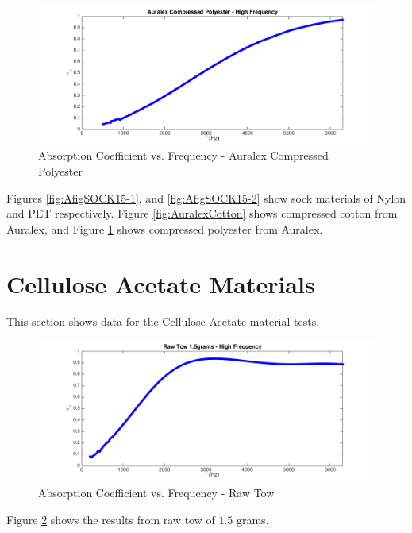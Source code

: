 \begin{figure}[hbtp]
    \centering
    \includegraphics[width=1\textwidth]{Chapter-4/figs/AuralexCompPoly}
    \caption{Absorption Coefficient vs. Frequency - Auralex Compressed Polyester}
    \label{fig:AuralexCompPoly}
\end{figure}

Figures \ref{fig:AfigSOCK15-1}, and \ref{fig:AfigSOCK15-2} show sock materials of Nylon and PET respectively. Figure \ref{fig:AuralexCotton} shows compressed cotton from Auralex, and Figure \ref{fig:AuralexCompPoly} shows compressed polyester from Auralex.

\clearpage

\section{Cellulose Acetate Materials}
This section shows data for the Cellulose Acetate material tests.

\begin{figure}[hbtp]
    \centering
    \includegraphics[width=1\textwidth]{Chapter-4/figs/Afigrawtow}
    \caption{Absorption Coefficient vs. Frequency - Raw Tow}
    \label{fig:Afigrawtow}
\end{figure}

Figure \ref{fig:Afigrawtow} shows the results from raw tow of $1.5$ grams.

